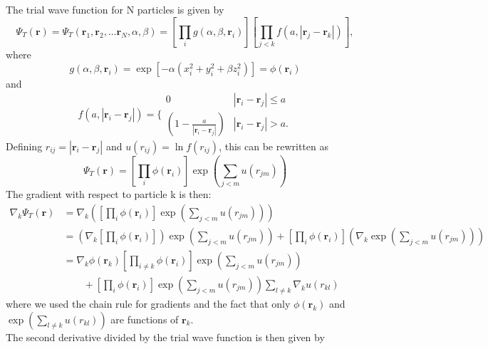 \documentclass[%
oneside,                 %
final,                   %
10pt]{article}
\begin{document}
The trial wave function for N particles is given by 
\begin{equation}
 \Psi_T(\mathbf{r})=\Psi_T(\mathbf{r}_1, \mathbf{r}_2, \dots \mathbf{r}_N,\alpha,\beta)
 =\left[
    \prod_i g(\alpha,\beta,\mathbf{r}_i)
 \right]
 \left[
    \prod_{j<k}f(a,|\mathbf{r}_j-\mathbf{r}_k|)
 \right],
 \label{eq:trialwf}
 \end{equation}
where 
\begin{equation}
    g(\alpha,\beta,\mathbf{r}_i)= \exp{[-\alpha(x_i^2+y_i^2+\beta z_i^2)]}=\phi(\mathbf{r}_i)
 \end{equation}
 and 
 \begin{equation}
    f(a,|\mathbf{r}_i-\mathbf{r}_j|)=\Bigg\{
 \begin{array}{ll}
	 0 & {|\mathbf{r}_i-\mathbf{r}_j|} \leq {a}\\
	 (1-\frac{a}{|\mathbf{r}_i-\mathbf{r}_j|}) & {|\mathbf{r}_i-\mathbf{r}_j|} > {a}.
 \end{array}
 \end{equation}
Defining $r_{ij}=|\mathbf{r}_i-\mathbf{r}_j|$ and $u(r_{ij})=\ln{f(r_{ij})}$,
this can be rewritten as 
\begin{equation*}
\Psi_T(\mathbf{r})=\left[
    \prod_i \phi(\mathbf{r}_i)
\right]
\exp{\left(\sum_{j<m}u(r_{jm})\right)}
\end{equation*}
The gradient with respect to particle k is then:
\begin{align*}
  \nabla_k\Psi_T(\mathbf{r})&= \nabla_k\left(\left[\prod_i \phi(\mathbf{r}_i)\right]
\exp{\left(\sum_{j<m}u(r_{jm})\right)}\right)
  \\
  & = \left(\nabla_k\left[\prod_i \phi(\mathbf{r}_i)\right]\right)\exp{\left(\sum_{j<m}u(r_{jm})\right)} + \left[\prod_i \phi(\mathbf{r}_i)\right]\left(\nabla_k
\exp{\left(\sum_{j<m}u(r_{jm})\right)}\right)
  \\
  & = \nabla_k\phi(\mathbf{r}_k)\left[\prod_{i\ne k}\phi(\mathbf{r}_i)\right]\exp{\left(\sum_{j<m}u(r_{jm})\right)}
  \\
  &\qquad
  +  \left[\prod_i\phi(\mathbf{r}_i)\right]
  \exp{\left(\sum_{j<m}u(r_{jm})\right)}\sum_{l\ne k}\nabla_k u(r_{kl})
\end{align*}
where we used the chain rule for gradients and the fact that only $\phi(\mathbf{r}_k)$ and $\exp(\sum_{l\ne k}u(r_{kl}))$ are functions of $\mathbf{r}_k$.
\\
The second derivative divided by the trial wave function is then given by 
\end{document}
